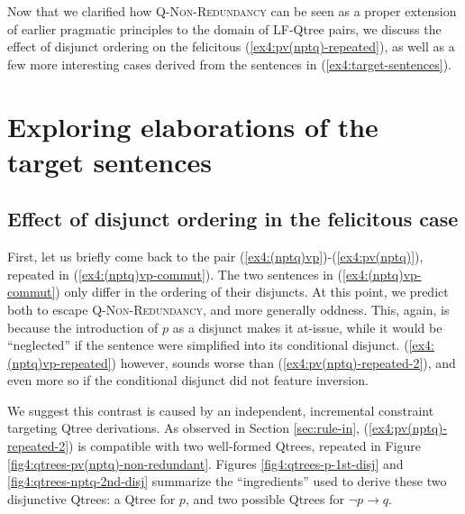 Now that we clarified how \textsc{Q-Non-Redundancy} can be seen as a proper extension of earlier pragmatic principles to the domain of LF-Qtree pairs, we discuss the effect of disjunct ordering on the felicitous (\ref{ex4:pv(nptq)-repeated}), as well as a few more interesting cases derived from the sentences in (\ref{ex4:target-sentences}).

\section{Exploring elaborations of the target sentences}\label{sec4:exploration}
\subsection{Effect of disjunct ordering in the felicitous case}\label{sec:ordering}

First, let us briefly come back to the pair (\ref{ex4:(nptq)vp})-(\ref{ex4:pv(nptq)}), repeated in (\ref{ex4:(nptq)vp-commut}). The two sentences in (\ref{ex4:(nptq)vp-commut}) only differ in the ordering of their disjuncts. At this point, we predict both to escape \textsc{Q-Non-Redundancy}, and more generally oddness. This, again, is because the introduction of $p$ as a disjunct makes it at-issue, while it would be ``neglected'' if the sentence were simplified into its conditional disjunct. (\ref{ex4:(nptq)vp-repeated}) however, sounds worse than (\ref{ex4:pv(nptq)-repeated-2}), and even more so if the conditional disjunct did not feature inversion.

\begin{exe}
	\ex \label{ex4:(nptq)vp-commut}
	\begin{xlist}
		\label{ex4:pv(nptq)-repeated-2}
		\label{ex4:(nptq)vp-repeated}
	\end{xlist}
\end{exe}

We suggest this contrast is caused by an independent, incremental constraint targeting Qtree derivations. As observed in Section \ref{sec:rule-in}, (\ref{ex4:pv(nptq)-repeated-2}) is compatible with two well-formed Qtrees, repeated in Figure \ref{fig4:qtrees-pv(nptq)-non-redundant}. Figures \ref{fig4:qtrees-p-1st-disj} and \ref{fig4:qtrees-nptq-2nd-disj} summarize the ``ingredients'' used to derive these two disjunctive Qtrees: a Qtree for $p$, and two possible Qtrees for $\neg p \rightarrow q$.

